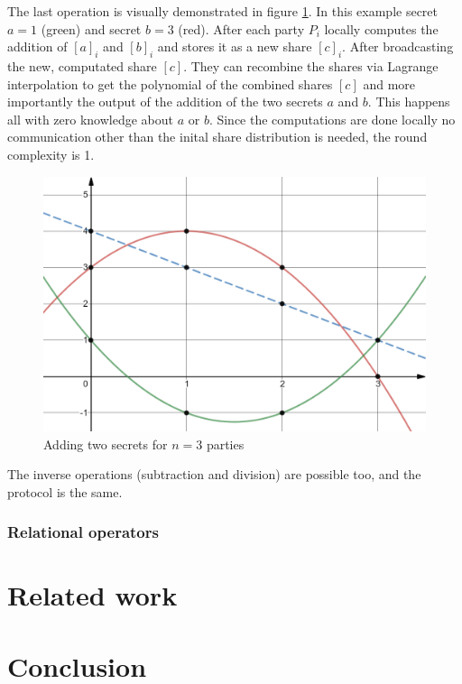 The last operation is visually demonstrated in figure \ref{fig:addsecrets}. In this example secret $a=1$ (green) and secret $b=3$ (red). After each party $P_i$ locally computes the addition of $[a]_i$ and $[b]_i$ and stores it as a new share $[c]_i$. After broadcasting the new, computated share $[c]$. They can recombine the shares via Lagrange interpolation to get the polynomial of the combined shares $[c]$ and more importantly the output of the addition of the two secrets $a$ and $b$. This happens all with zero knowledge about $a$ or $b$. Since the computations are done locally no communication other than the inital share distribution is needed, the round complexity is 1.

\begin{figure}
  \includegraphics[width=\linewidth]{plots/addsecrets.png}
  \caption{Adding two secrets for $n=3$ parties}
  \label{fig:addsecrets}
\end{figure}

The inverse operations (subtraction and division) are possible too, and the protocol is the same.

\subsubsection{Relational operators}

\section{Related work}

\section{Conclusion}

